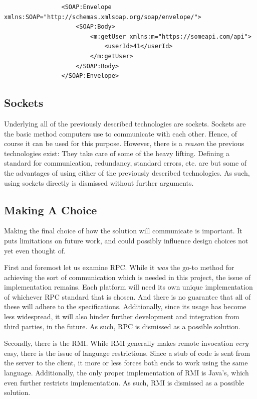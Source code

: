 			\begin{verbatim}
				<SOAP:Envelope xmlns:SOAP="http://schemas.xmlsoap.org/soap/envelope/">
				    <SOAP:Body>
				        <m:getUser xmlns:m="https://someapi.com/api">
				            <userId>41</userId>
				        </m:getUser>
				    </SOAP:Body>
				</SOAP:Envelope>
			\end{verbatim}

		\subsection{Sockets}
			Underlying all of the previously described technologies are sockets. Sockets are the basic method computers use to communicate with each other. Hence, of course it can be used for this purpose. However, there is a \emph{reason} the previous technologies exist: They take care of some of the heavy lifting. Defining a standard for communication, redundancy, standard errors, etc. are but some of the advantages of using either of the previously described technologies. As such, using sockets directly is dismissed without further arguments. 

		\subsection{Making A Choice}
			\label{sec:design:choosing-rest}
			Making the final choice of how the solution will communicate is important. It puts limitations on future work, and could possibly influence design choices not yet even thought of. 

			First and foremost let us examine RPC. While it \emph{was} the go-to method for achieving the sort of communication which is needed in this project, the issue of implementation remains. Each platform will need its own unique implementation of whichever RPC standard that is chosen. And there is no guarantee that all of these will adhere to the specifications. Additionally, since its usage has become less widespread, it will also hinder further development and integration from third parties, in the future. As such, RPC is dismissed as a possible solution.

			Secondly, there is the RMI. While RMI generally makes remote invocation \emph{very} easy, there is the issue of language restrictions. Since a stub of code is sent from the server to the client, it more or less forces both ends to work using the same language. Additionally, the only proper implementation of RMI is Java's, which even further restricts implementation. As such, RMI is dismissed as a possible solution.

